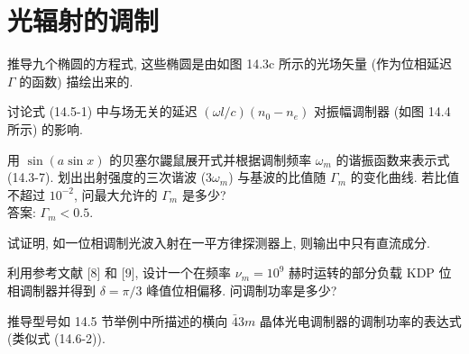 \documentclass{note}
\begin{document}
\fi
\setcounter{chapter}{13}
\chapter{光辐射的调制}
\begin{exe}
    推导九个椭圆的方程式, 这些椭圆是由如图 14.3c 所示的光场矢量 (作为位相延迟 $\Gamma$ 的函数) 描绘出来的.
\end{exe}
\begin{pf}

\end{pf}

\begin{exe}
    讨论式 (14.5-1) 中与场无关的延迟 $(\omega l/c)(n_0-n_e)$ 对振幅调制器 (如图 14.4 所示) 的影响.
\end{exe}
\begin{sol}

\end{sol}

\begin{exe}
    用 $\sin(a\sin x)$ 的贝塞尔鼹鼠展开式并根据调制频率 $\omega_m$ 的谐振函数来表示式 (14.3-7). 划出出射强度的三次谐波 ($3\omega_m$) 与基波的比值随 $\Gamma_m$ 的变化曲线. 若比值不超过 $10^{-2}$, 问最大允许的 $\Gamma_m$ 是多少?\\
    答案: $\Gamma_m<0.5$.
\end{exe}
\begin{sol}
    
\end{sol}

\begin{exe}
    试证明, 如一位相调制光波入射在一平方律探测器上, 则输出中只有直流成分.
\end{exe}
\begin{pf}
    
\end{pf}

\begin{exe}
    利用参考文献 [8] 和 [9], 设计一个在频率 $\nu_m=10^9$ 赫时运转的部分负载 KDP 位相调制器并得到 $\delta=\pi/3$ 峰值位相偏移. 问调制功率是多少?
\end{exe}
\begin{sol}
    
\end{sol}

\begin{exe}
    推导型号如 14.5 节举例中所描述的横向 $\bar{4}3m$ 晶体光电调制器的调制功率的表达式 (类似式 (14.6-2)).
\end{exe}
\begin{pf}
    
\end{pf}
\end{document}
